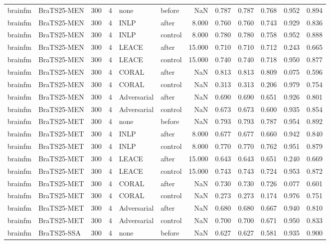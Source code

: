 \begin{tabular}{llrrllrrrrrr}
brainfm & BraTS25-MEN & 300 & 4 & none & before & NaN & 0.787 & 0.787 & 0.768 & 0.952 & 0.894 \\
brainfm & BraTS25-MEN & 300 & 4 & INLP & after & 8.000 & 0.760 & 0.760 & 0.743 & 0.929 & 0.836 \\
brainfm & BraTS25-MEN & 300 & 4 & INLP & control & 8.000 & 0.780 & 0.780 & 0.758 & 0.952 & 0.888 \\
brainfm & BraTS25-MEN & 300 & 4 & LEACE & after & 15.000 & 0.710 & 0.710 & 0.712 & 0.243 & 0.665 \\
brainfm & BraTS25-MEN & 300 & 4 & LEACE & control & 15.000 & 0.740 & 0.740 & 0.718 & 0.950 & 0.877 \\
brainfm & BraTS25-MEN & 300 & 4 & CORAL & after & NaN & 0.813 & 0.813 & 0.809 & 0.075 & 0.596 \\
brainfm & BraTS25-MEN & 300 & 4 & CORAL & control & NaN & 0.313 & 0.313 & 0.206 & 0.979 & 0.754 \\
brainfm & BraTS25-MEN & 300 & 4 & Adversarial & after & NaN & 0.690 & 0.690 & 0.651 & 0.926 & 0.801 \\
brainfm & BraTS25-MEN & 300 & 4 & Adversarial & control & NaN & 0.673 & 0.673 & 0.600 & 0.935 & 0.854 \\
brainfm & BraTS25-MET & 300 & 4 & none & before & NaN & 0.793 & 0.793 & 0.787 & 0.954 & 0.892 \\
brainfm & BraTS25-MET & 300 & 4 & INLP & after & 8.000 & 0.677 & 0.677 & 0.660 & 0.942 & 0.840 \\
brainfm & BraTS25-MET & 300 & 4 & INLP & control & 8.000 & 0.770 & 0.770 & 0.762 & 0.951 & 0.879 \\
brainfm & BraTS25-MET & 300 & 4 & LEACE & after & 15.000 & 0.643 & 0.643 & 0.651 & 0.240 & 0.669 \\
brainfm & BraTS25-MET & 300 & 4 & LEACE & control & 15.000 & 0.743 & 0.743 & 0.724 & 0.953 & 0.872 \\
brainfm & BraTS25-MET & 300 & 4 & CORAL & after & NaN & 0.730 & 0.730 & 0.726 & 0.077 & 0.601 \\
brainfm & BraTS25-MET & 300 & 4 & CORAL & control & NaN & 0.273 & 0.273 & 0.174 & 0.976 & 0.751 \\
brainfm & BraTS25-MET & 300 & 4 & Adversarial & after & NaN & 0.680 & 0.680 & 0.667 & 0.940 & 0.810 \\
brainfm & BraTS25-MET & 300 & 4 & Adversarial & control & NaN & 0.700 & 0.700 & 0.671 & 0.950 & 0.833 \\
brainfm & BraTS25-SSA & 300 & 4 & none & before & NaN & 0.627 & 0.627 & 0.581 & 0.935 & 0.900 \\

\end{tabular}
